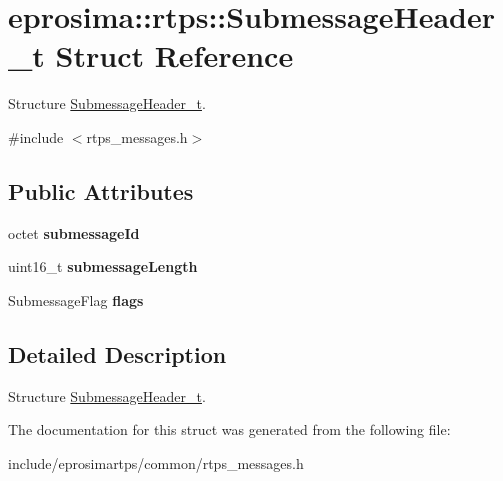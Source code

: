 \hypertarget{structeprosima_1_1rtps_1_1_submessage_header__t}{\section{eprosima\-:\-:rtps\-:\-:\-Submessage\-Header\-\_\-t \-Struct \-Reference}
\label{structeprosima_1_1rtps_1_1_submessage_header__t}
}


\-Structure \hyperlink{structeprosima_1_1rtps_1_1_submessage_header__t}{\-Submessage\-Header\-\_\-t}.  




{\ttfamily \#include $<$rtps\-\_\-messages.\-h$>$}

\subsection*{\-Public \-Attributes}
\begin{DoxyCompactItemize}
\item 
\hypertarget{structeprosima_1_1rtps_1_1_submessage_header__t_ac5c8acd0f9c76feb48dd05c4cea37b9e}{octet {\bfseries submessage\-Id}}\label{structeprosima_1_1rtps_1_1_submessage_header__t_ac5c8acd0f9c76feb48dd05c4cea37b9e}

\item 
\hypertarget{structeprosima_1_1rtps_1_1_submessage_header__t_ae4e4f825475e67df2da27aa85c58870a}{uint16\-\_\-t {\bfseries submessage\-Length}}\label{structeprosima_1_1rtps_1_1_submessage_header__t_ae4e4f825475e67df2da27aa85c58870a}

\item 
\hypertarget{structeprosima_1_1rtps_1_1_submessage_header__t_ae44d4dc24760ee73dd3bc49f496af387}{\-Submessage\-Flag {\bfseries flags}}\label{structeprosima_1_1rtps_1_1_submessage_header__t_ae44d4dc24760ee73dd3bc49f496af387}

\end{DoxyCompactItemize}


\subsection{\-Detailed \-Description}
\-Structure \hyperlink{structeprosima_1_1rtps_1_1_submessage_header__t}{\-Submessage\-Header\-\_\-t}. 

\-The documentation for this struct was generated from the following file\-:\begin{DoxyCompactItemize}
\item 
include/eprosimartps/common/rtps\-\_\-messages.\-h\end{DoxyCompactItemize}
